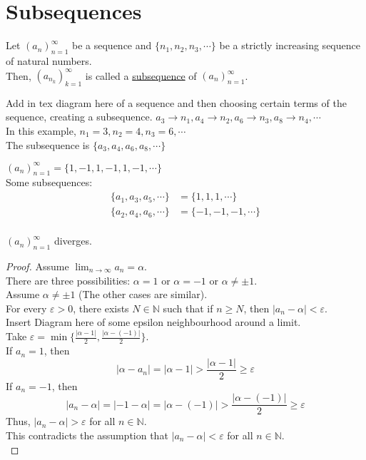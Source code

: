 \section{Subsequences}
\begin{definition}
    Let \(\left(a_n\right)_{n=1}^\infty\) be a sequence and \(\{n_1, n_2, n_3, \cdots\}\) be a strictly increasing sequence of natural numbers.\\
    Then, \(\left(a_{n_k}\right)_{k=1}^\infty\) is called a \underline{subsequence} of \(\left(a_n\right)_{n=1}^\infty\).
\end{definition}
Add in tex diagram here of a sequence and then choosing certain terms of the sequence, creating a subsequence. \(a_3 \to n_1, a_4 \to n_2, a_6 \to n_3, a_8 \to n_4, \cdots\)\\
In this example, \(n_1 = 3, n_2 = 4, n_3 = 6, \cdots\)\\
The subsequence is \(\{a_3, a_4, a_6, a_8, \cdots\}\)\\
\begin{example}
    \(\left(a_n\right)_{n=1}^\infty = \{1, -1, 1, -1, 1, -1, \cdots\}\)\\
    Some subsequences:\\
    \begin{align*}
        \{a_1, a_3, a_5, \cdots\} &= \{1, 1, 1, \cdots\}\\
        \{a_2, a_4, a_6, \cdots\} &= \{-1, -1, -1, \cdots\}\\
    \end{align*}
\end{example}
\begin{proposition}
    \(\left(a_n\right)_{n=1}^\infty\) diverges.\\
\end{proposition}
\begin{proof}
    Assume \(\displaystyle\lim_{n\to\infty} a_n = \alpha\).\\
    There are three possibilities: \(\alpha = 1\) or \(\alpha = -1\) or \(\alpha \neq \pm 1\).\\
    Assume \(\alpha \neq \pm 1\) (The other cases are similar).\\
    For every \(\varepsilon > 0\), there exists \(N \in \mathbb N\) such that if \(n \ge N\), then \(|a_n - \alpha| < \varepsilon\).\\
    Insert Diagram here of some epsilon neighbourhood around a limit.\\
    Take \(\varepsilon = \min\{\frac{|\alpha - 1|}{2}, \frac{|\alpha - (-1)|}{2}\}\).\\
    If \(a_n = 1\), then \[|\alpha - a_n| = |\alpha - 1| > \frac{|\alpha - 1|}{2} \ge \varepsilon\]
    If \(a_n = -1\), then 
    \[|a_n - \alpha| = |-1 - \alpha| = |\alpha - (-1)| > \frac{|\alpha - (-1)|}{2} \ge \varepsilon\]
    Thus, \(|a_n - \alpha| > \varepsilon\) for all \(n \in \mathbb N\).\\
    This contradicts the assumption that \(|a_n - \alpha| < \varepsilon\) for all \(n \in \mathbb N\).\\
\end{proof}
